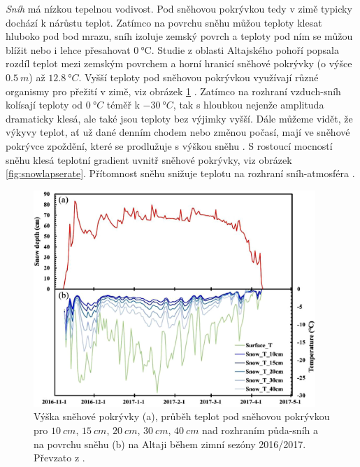 \textit{Sníh} má nízkou tepelnou vodivost. Pod sněhovou pokrývkou tedy v zimě typicky dochází k nárůstu teplot. Zatímco na povrchu sněhu můžou teploty klesat hluboko pod bod mrazu, sníh izoluje zemský povrch a teploty pod ním se můžou blížit nebo i lehce přesahovat $\SI{0}{\celsius}$. Studie z oblasti Altajského pohoří popsala rozdíl teplot mezi zemským povrchem a horní hranicí sněhové pokrývky (o výšce $\SI{0.5}{m}$) až $\SI{12.8}{\degree C}$. Vyšší teploty pod sněhovou pokrývkou využívají různé organismy pro přežití v zimě, viz obrázek \ref{fig:snowtempaltai} \parencite{hirakawahirofumi2018}. Zatímco na rozhraní vzduch-sníh kolísají teploty od $\SI{0}{\degree C}$ téměř k $\SI{-30}{\degree C}$, tak s hloubkou nejenže amplituda dramaticky klesá, ale také jsou teploty bez výjimky vyšší. Dále můžeme vidět, že výkyvy teplot, ať už dané denním chodem nebo změnou počasí, mají ve sněhové pokrývce zpoždění, které se prodlužuje s výškou sněhu \parencite{zhangwei2021}. S rostoucí mocností sněhu klesá teplotní gradient uvnitř sněhové pokrývky, viz obrázek \ref{fig:snowlapserate}. Přítomnost sněhu snižuje teplotu na rozhraní sníh-atmosféra \parencite{zhangwei2021}.

\begin{figure}
	\centering
	\includegraphics[width=0.95\textwidth]{img/ch1/snowtempaltai.png}
	\caption{Výška sněhové pokrývky (a), průběh teplot pod sněhovou pokrývkou pro $\SI{10}{cm}$, $\SI{15}{cm}$, $\SI{20}{cm}$, $\SI{30}{cm}$, $\SI{40}{cm}$ nad rozhraním půda-sníh a na povrchu sněhu (b) na Altaji během zimní sezóny 2016/2017. Převzato z \cite{zhangwei2021}.}
	\label{fig:snowtempaltai}
\end{figure}

